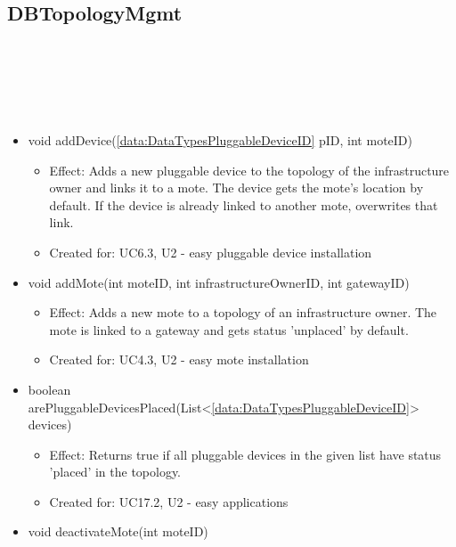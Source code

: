   \subsection{DBTopologyMgmt}\label{int:DeviceDatabaseDeviceDBDBTopologyMgmt}
    \begin{description}
      \item[Provided by:] \iconcomponent{}~
      \item[Required by:] \iconcomponent{}~
      \item[Operations:] ~
    \begin{itemize}[noitemsep,nolistsep,leftmargin=-.25cm]
      \item \textsf{void addDevice(\ref{data:DataTypesPluggableDeviceID} pID, int moteID)}
        \begin{itemize}[noitemsep,nolistsep]
           \item Effect: Adds a new pluggable device to the topology of the infrastructure owner and links it to a mote. The device gets the mote's location by default. If the device is already linked to another mote, overwrites that link.
\item Created for: UC6.3, U2 - easy pluggable device installation
        \end{itemize}
      \item \textsf{void addMote(int moteID, int infrastructureOwnerID, int gatewayID)}
        \begin{itemize}[noitemsep,nolistsep]
           \item Effect: Adds a new mote to a topology of an infrastructure owner. The mote is linked to a gateway and gets status 'unplaced' by default.
\item Created for: UC4.3, U2 - easy mote installation
        \end{itemize}
      \item \textsf{boolean arePluggableDevicesPlaced(List\textless{}\ref{data:DataTypesPluggableDeviceID}\textgreater{} devices)}
        \begin{itemize}[noitemsep,nolistsep]
           \item Effect: Returns true if all pluggable devices in the given list have status 'placed' in the topology.
\item Created for: UC17.2, U2 - easy applications
        \end{itemize}
      \item \textsf{void deactivateMote(int moteID)}

\end{itemize}
\end{description}
